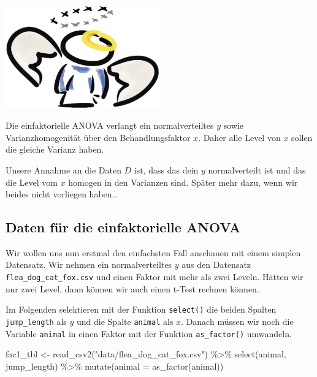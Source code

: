 \documentclass[
  letterpaper,
]{scrbook}
\newenvironment{Shaded}{\begin{snugshade}}{\end{snugshade}}
\newcommand{\AttributeTok}[1]{\textcolor[rgb]{0.40,0.45,0.13}{#1}}
\newcommand{\FunctionTok}[1]{\textcolor[rgb]{0.28,0.35,0.67}{#1}}
\newcommand{\NormalTok}[1]{\textcolor[rgb]{0.00,0.23,0.31}{#1}}
\newcommand{\OtherTok}[1]{\textcolor[rgb]{0.00,0.23,0.31}{#1}}
\newcommand{\SpecialCharTok}[1]{\textcolor[rgb]{0.37,0.37,0.37}{#1}}
\newcommand{\StringTok}[1]{\textcolor[rgb]{0.13,0.47,0.30}{#1}}
\begin{document}
\begin{marginfigure}

{\centering \includegraphics[width=0.5\textwidth,height=\textheight]{./images/angel_01.png}

}

\end{marginfigure}

Die einfaktorielle ANOVA verlangt ein normalverteiltes \(y\) sowie
Varianzhomogenität über den Behandlungsfaktor \(x\). Daher alle Level
von \(x\) sollen die gleiche Varianz haben.

Unsere Annahme an die Daten \(D\) ist, dass das dein \(y\)
normalverteilt ist und das die Level vom \(x\) homogen in den Varianzen
sind. Später mehr dazu, wenn wir beides nicht vorliegen haben\ldots{}

\hypertarget{daten-fuxfcr-die-einfaktorielle-anova}{%
\subsection{Daten für die einfaktorielle
ANOVA}\label{daten-fuxfcr-die-einfaktorielle-anova}}

Wir wollen uns nun erstmal den einfachsten Fall anschauen mit einem
simplen Datensatz. Wir nehmen ein normalverteiltes \(y\) aus den
Datensatz \texttt{flea\_dog\_cat\_fox.csv} und einen Faktor mit mehr als
zwei Leveln. Hätten wir nur zwei Level, dann können wir auch einen
t-Test rechnen können.

Im Folgenden selektieren mit der Funktion \texttt{select()} die beiden
Spalten \texttt{jump\_length} als \(y\) und die Spalte \texttt{animal}
als \(x\). Danach müssen wir noch die Variable \texttt{animal} in einen
Faktor mit der Funktion \texttt{as\_factor()} umwandeln.

\begin{Shaded}
\begin{Highlighting}[]
\NormalTok{fac1\_tbl }\OtherTok{\textless{}{-}} \FunctionTok{read\_csv2}\NormalTok{(}\StringTok{"data/flea\_dog\_cat\_fox.csv"}\NormalTok{) }\SpecialCharTok{\%\textgreater{}\%}
  \FunctionTok{select}\NormalTok{(animal, jump\_length) }\SpecialCharTok{\%\textgreater{}\%} 
  \FunctionTok{mutate}\NormalTok{(}\AttributeTok{animal =} \FunctionTok{as\_factor}\NormalTok{(animal))}
\end{Highlighting}
\end{Shaded}
\end{document}
